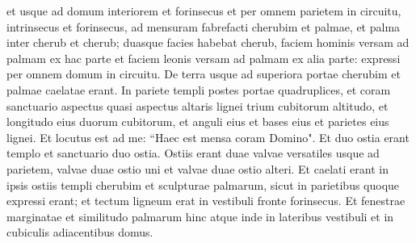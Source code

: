 \begin{biblechapter}
\verse et usque ad domum interiorem et forinsecus et per omnem parietem in circuitu, intrinsecus et forinsecus, ad mensuram 
\verse fabrefacti cherubim et palmae, et palma inter cherub et cherub; duasque facies habebat cherub, 
\verse faciem hominis versam ad palmam ex hac parte et faciem leonis versam ad palmam ex alia parte: expressi per omnem domum in circuitu.  
\verse De terra usque ad superiora portae cherubim et palmae caelatae erant. In pariete templi 
\verse postes portae quadruplices, et coram sanctuario aspectus quasi aspectus 
\verse altaris lignei trium cubitorum altitudo, et longitudo eius duorum cubitorum, et anguli eius et bases eius et parietes eius lignei. Et locutus est ad me: “Haec est mensa coram Domino". 
\verse Et duo ostia erant templo et sanctuario 
\verse duo ostia. Ostiis erant duae valvae versatiles usque ad parietem, valvae duae ostio uni et valvae duae ostio alteri. 
\verse Et caelati erant in ipsis ostiis templi cherubim et sculpturae palmarum, sicut in parietibus quoque expressi erant; et tectum ligneum erat in vestibuli fronte forinsecus. 
\verse Et fenestrae marginatae et similitudo palmarum hinc atque inde in lateribus vestibuli et in cubiculis adiacentibus domus. 
\end{biblechapter}


